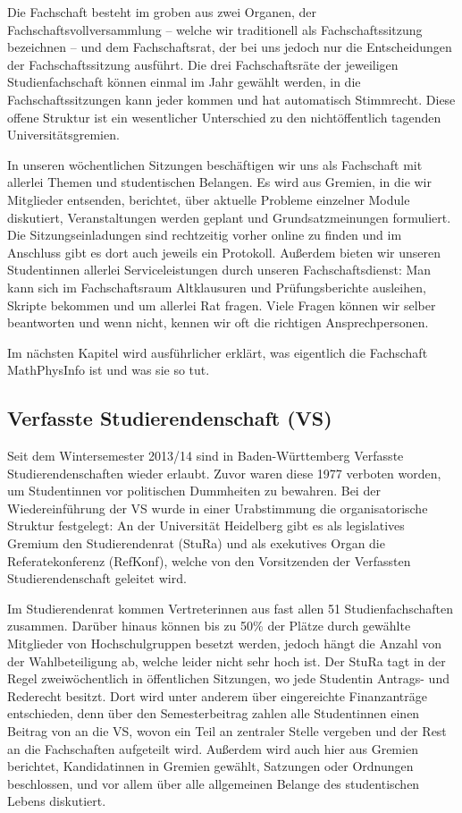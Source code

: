 Die Fachschaft besteht im groben aus zwei Organen, der Fachschaftsvollversammlung -- welche wir traditionell als Fachschaftssitzung bezeichnen -- und dem Fachschaftsrat, der bei uns jedoch nur die Entscheidungen der Fachschaftssitzung ausführt. Die drei Fachschaftsräte der jeweiligen Studienfachschaft können einmal im Jahr gewählt werden, in die Fachschaftssitzungen kann jeder kommen und hat automatisch Stimmrecht. Diese offene Struktur ist ein wesentlicher Unterschied zu den nichtöffentlich tagenden Universitätsgremien. 

In unseren wöchentlichen Sitzungen beschäftigen wir uns als Fachschaft mit allerlei Themen und studentischen Belangen. 
Es wird aus Gremien, in die wir Mitglieder entsenden, berichtet, über aktuelle Probleme einzelner Module diskutiert, Veranstaltungen werden geplant und Grundsatzmeinungen formuliert. Die Sitzungseinladungen sind rechtzeitig vorher online zu finden und im Anschluss gibt es dort auch jeweils ein Protokoll. Außerdem bieten wir unseren Studentinnen allerlei Serviceleistungen durch unseren Fachschaftsdienst: Man kann sich im Fachschaftsraum Altklausuren und Prüfungsberichte ausleihen, Skripte bekommen und um allerlei Rat fragen. Viele Fragen können wir selber beantworten und wenn nicht, kennen wir oft die richtigen Ansprechpersonen.

Im nächsten Kapitel wird ausführlicher erklärt, was eigentlich die Fachschaft MathPhysInfo ist und was sie so tut.

\subsection{Verfasste Studierendenschaft (VS)}
Seit dem Wintersemester 2013/14 sind in Baden-Württemberg Verfasste Studierendenschaften wieder erlaubt. 
Zuvor waren diese 1977 verboten worden, um Studentinnen vor politischen Dummheiten zu bewahren. 
Bei der Wiedereinführung der VS wurde in einer Urabstimmung die organisatorische Struktur festgelegt: 
An der Universität Heidelberg gibt es als legislatives Gremium den Studierendenrat (StuRa) und als exekutives Organ die Referatekonferenz (RefKonf), welche von den Vorsitzenden der Verfassten Studierendenschaft geleitet wird.

Im Studierendenrat kommen Vertreterinnen aus fast allen 51 Studienfachschaften zusammen. 
Darüber hinaus können bis zu 50\% der Plätze durch gewählte Mitglieder von Hochschulgruppen besetzt werden, jedoch hängt die Anzahl von der Wahlbeteiligung ab, welche leider nicht sehr hoch ist. 
Der StuRa tagt in der Regel zweiwöchentlich in öffentlichen Sitzungen, wo jede Studentin Antrags- und Rederecht besitzt. 
Dort wird unter anderem über eingereichte Finanzanträge entschieden, denn über den Semesterbeitrag zahlen alle Studentinnen einen Beitrag von \EUR{\vsbeitrag} an die VS, wovon ein Teil an zentraler Stelle vergeben und der Rest an die Fachschaften aufgeteilt wird. 
Außerdem wird auch hier aus Gremien berichtet, Kandidatinnen in Gremien gewählt, Satzungen oder Ordnungen beschlossen, und vor allem über alle allgemeinen Belange des studentischen Lebens diskutiert.

